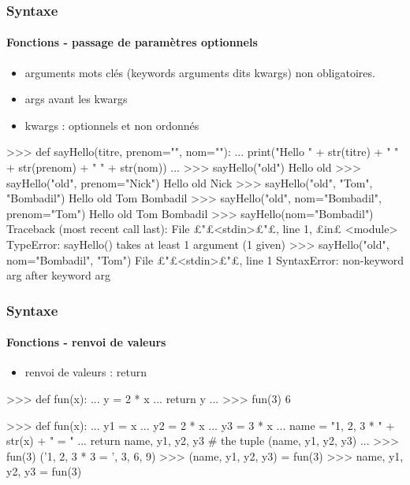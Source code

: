 \begin{frame}[fragile]
\frametitle{Syntaxe}
\framesubtitle{Fonctions - passage de paramètres optionnels}
\begin{itemize}
\item arguments mots clés (keywords arguments dits kwargs) non obligatoires. 
\item args avant les kwargs
\item kwargs : optionnels et non ordonnés
\end{itemize}
\begin{pythonConsole}
>>> def sayHello(titre, prenom="", nom=""): 
...    print("Hello " + str(titre) + " " + str(prenom) + " " + str(nom))
...
>>> sayHello("old")
Hello old
>>> sayHello("old", prenom="Nick")
Hello old Nick
>>> sayHello("old", "Tom", "Bombadil")
Hello old Tom Bombadil
>>> sayHello("old", nom="Bombadil", prenom="Tom")
Hello old Tom Bombadil
>>> sayHello(nom="Bombadil")
Traceback (most recent call last):
  File £"£<stdin>£"£, line 1, £in£ <module>
TypeError: sayHello() takes at least 1 argument (1 given)
>>> sayHello("old", nom="Bombadil", "Tom")
  File £"£<stdin>£"£, line 1
SyntaxError: non-keyword arg after keyword arg
\end{pythonConsole}
\end{frame}
\begin{frame}[fragile]
\frametitle{Syntaxe}
\framesubtitle{Fonctions - renvoi de valeurs}
\begin{itemize}
\item renvoi de valeurs : return
\end{itemize}
\begin{pythonConsole}
>>> def fun(x): 
...    y = 2 * x
...    return y
...
>>> fun(3)
6
\end{pythonConsole}
\begin{pythonConsole}
>>> def fun(x): 
...    y1 = x
...    y2 = 2 * x
...    y3 = 3 * x
...    name = "1, 2, 3 * " + str(x) + " = "
...    return name, y1, y2, y3 # the tuple (name, y1, y2, y3)
...
>>> fun(3)
('1, 2, 3 * 3 = ', 3, 6, 9)
>>> (name, y1, y2, y3) = fun(3)
>>> name, y1, y2, y3 = fun(3)
\end{pythonConsole}
\end{frame}
